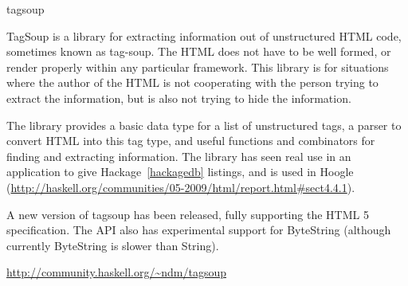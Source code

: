 \begin{hcarentry}{tagsoup}
\label{tagsoup}
\makeheader

TagSoup is a library for extracting information out of unstructured HTML code, sometimes
known as tag-soup. The HTML does not have to be well formed, or render properly within
any particular framework. This library is for situations where the author of the HTML
is not cooperating with the person trying to extract the information, but is also not
trying to hide the information.

The library provides a basic data type for a list of unstructured tags, a parser to
convert HTML into this tag type, and useful functions and combinators for finding and
extracting information. The library has seen real use in an application to give
Hackage~\cref{hackagedb} listings, and is used in Hoogle (\url{http://haskell.org/communities/05-2009/html/report.html#sect4.4.1}).

A new version of tagsoup has been released, fully supporting the HTML 5 specification. The
API also has experimental support for ByteString (although currently ByteString is slower
than String).

\FurtherReading
\url{http://community.haskell.org/~ndm/tagsoup}
\end{hcarentry}
